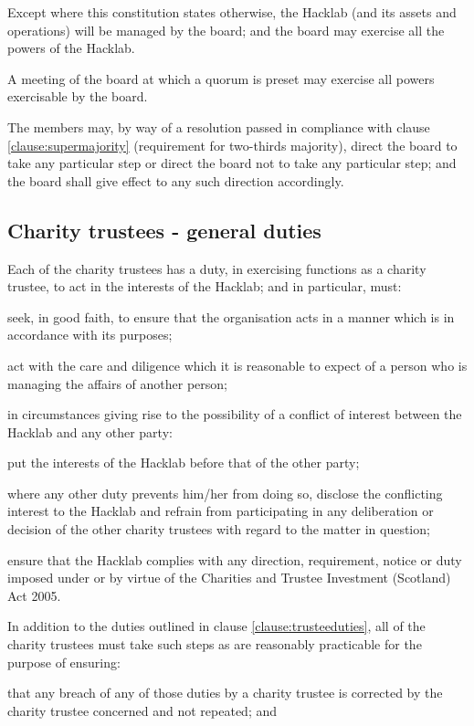 \documentclass{article}
\newcommand{\charityact}{Charities and Trustee Investment (Scotland) Act 2005}
\begin{document}
\clause Except where this constitution states otherwise, the
Hacklab (and its assets and operations) will be managed by the
board; and the board may exercise all the powers of the Hacklab.

\clause A meeting of the board at which a quorum is preset may
exercise all powers exercisable by the board.

\clause The members may, by way of a resolution passed in compliance
with clause \ref{clause:supermajority} (requirement for two-thirds
majority), direct the board to take any particular step or direct the
board not to take any particular step; and the board shall give effect
to any such direction accordingly.

\subsection{Charity trustees - general duties}

\clause\label{clause:trusteeduties}Each of the charity trustees has a duty, in exercising
functions as a charity trustee, to act in the interests of the
Hacklab; and in particular, must:

\subclause seek, in good faith, to ensure that the organisation acts
in a manner which is in accordance with its purposes;

\subclause act with the care and diligence which it is reasonable to
expect of a person who is managing the affairs of another person;

\subclause in circumstances giving rise to the possibility of a
conflict of interest between the Hacklab and any other party:

\subclause put the interests of the Hacklab before that of the
other party;

\subsubclause where any other duty prevents him/her from doing so,
disclose the conflicting interest to the Hacklab and refrain from
participating in any deliberation or decision of the other charity
trustees with regard to the matter in question;

\subclause ensure that the Hacklab complies with any direction,
requirement, notice or duty imposed under or by virtue of the
\charityact.

\clause In addition to the duties outlined in clause
\ref{clause:trusteeduties}, all of the charity trustees must take such 
steps as are reasonably practicable for the purpose of ensuring:

\subclause that any breach of any of those duties by a charity trustee
is corrected by the charity trustee concerned and not repeated; and
\end{document}
